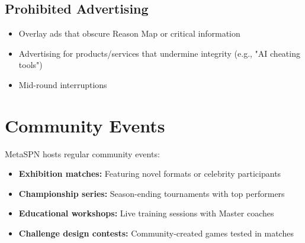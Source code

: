 \subsection{Prohibited Advertising}

\begin{itemize}[leftmargin=*]
  \item Overlay ads that obscure Reason Map or critical information
  \item Advertising for products/services that undermine integrity (e.g., "AI cheating tools")
  \item Mid-round interruptions
\end{itemize}

\section{Community Events}

MetaSPN hosts regular community events:

\begin{itemize}[leftmargin=*]
  \item \textbf{Exhibition matches:} Featuring novel formats or celebrity participants
  \item \textbf{Championship series:} Season-ending tournaments with top performers
  \item \textbf{Educational workshops:} Live training sessions with Master coaches
  \item \textbf{Challenge design contests:} Community-created games tested in matches
\end{itemize}

